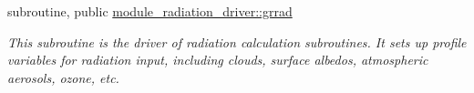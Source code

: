 {\bf }\par
\begin{DoxyCompactItemize}
\item 
subroutine, public \hyperlink{namespacemodule__radiation__driver_a8285cf6a4d2e1ed25b0afff8e269ec63}{module\+\_\+radiation\+\_\+driver\+::grrad}                                                                                                 
\begin{DoxyCompactList}\small\item\em This subroutine is the driver of radiation calculation subroutines. It sets up profile variables for radiation input, including clouds, surface albedos, atmospheric aerosols, ozone, etc. \end{DoxyCompactList}\end{DoxyCompactItemize}

